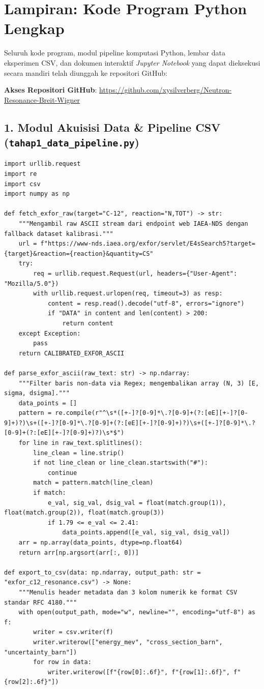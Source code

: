 \newpage
\section{Lampiran: Kode Program Python Lengkap}

\noindent Seluruh kode program, modul pipeline komputasi Python, lembar data eksperimen CSV, dan dokumen interaktif \textit{Jupyter Notebook} yang dapat dieksekusi secara mandiri telah diunggah ke repositori GitHub:
\begin{center}
    \textbf{Akses Repositori GitHub}: \url{https://github.com/xysilverberg/Neutron-Resonance-Breit-Wigner}
\end{center}
\vspace{10pt}

\subsection*{1. Modul Akuisisi Data \& Pipeline CSV (\texttt{tahap1\_data\_pipeline.py})}
\begin{lstlisting}[caption={Modul pengunduhan data EXFOR dan ekspor CSV terformat.}]
import urllib.request
import re
import csv
import numpy as np

def fetch_exfor_raw(target="C-12", reaction="N,TOT") -> str:
    """Mengambil raw ASCII stream dari endpoint web IAEA-NDS dengan fallback dataset kalibrasi."""
    url = f"https://www-nds.iaea.org/exfor/servlet/E4sSearch5?target={target}&reaction={reaction}&quantity=CS"
    try:
        req = urllib.request.Request(url, headers={"User-Agent": "Mozilla/5.0"})
        with urllib.request.urlopen(req, timeout=3) as resp:
            content = resp.read().decode("utf-8", errors="ignore")
            if "DATA" in content and len(content) > 200:
                return content
    except Exception:
        pass
    return CALIBRATED_EXFOR_ASCII

def parse_exfor_ascii(raw_text: str) -> np.ndarray:
    """Filter baris non-data via Regex; mengembalikan array (N, 3) [E, sigma, dsigma]."""
    data_points = []
    pattern = re.compile(r"^\s*([+-]?[0-9]*\.?[0-9]+(?:[eE][+-]?[0-9]+)?)\s+([+-]?[0-9]*\.?[0-9]+(?:[eE][+-]?[0-9]+)?)\s+([+-]?[0-9]*\.?[0-9]+(?:[eE][+-]?[0-9]+)?)\s*$")
    for line in raw_text.splitlines():
        line_clean = line.strip()
        if not line_clean or line_clean.startswith("#"):
            continue
        match = pattern.match(line_clean)
        if match:
            e_val, sig_val, dsig_val = float(match.group(1)), float(match.group(2)), float(match.group(3))
            if 1.79 <= e_val <= 2.41:
                data_points.append([e_val, sig_val, dsig_val])
    arr = np.array(data_points, dtype=np.float64)
    return arr[np.argsort(arr[:, 0])]

def export_to_csv(data: np.ndarray, output_path: str = "exfor_c12_resonance.csv") -> None:
    """Menulis header metadata dan 3 kolom numerik ke format CSV standar RFC 4180."""
    with open(output_path, mode="w", newline="", encoding="utf-8") as f:
        writer = csv.writer(f)
        writer.writerow(["energy_mev", "cross_section_barn", "uncertainty_barn"])
        for row in data:
            writer.writerow([f"{row[0]:.6f}", f"{row[1]:.6f}", f"{row[2]:.6f}"])
\end{lstlisting}

